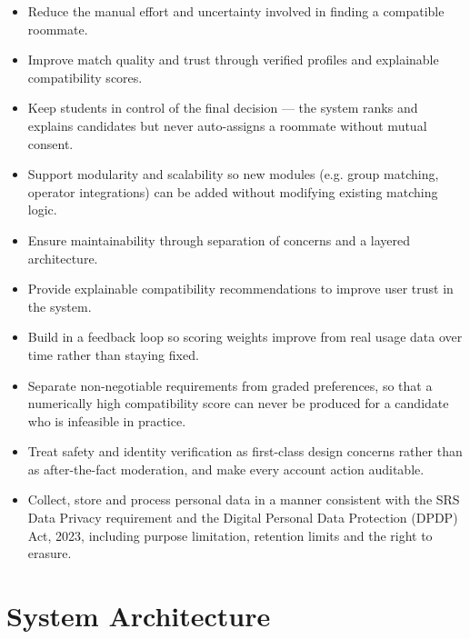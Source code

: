 \documentclass[12pt,a4paper]{report}
\begin{document}
\begin{itemize}[noitemsep]
    \item Reduce the manual effort and uncertainty involved in finding a compatible roommate.
    \vspace{1mm}
    \item Improve match quality and trust through verified profiles and explainable compatibility scores.
    \vspace{1mm}
    \item Keep students in control of the final decision --- the system ranks and explains candidates but never auto-assigns a roommate without mutual consent.
    \vspace{1mm}
    \item Support modularity and scalability so new modules (e.g. group matching, operator integrations) can be added without modifying existing matching logic.
    \vspace{1mm}
    \item Ensure maintainability through separation of concerns and a layered architecture.
    \vspace{1mm}
    \item Provide explainable compatibility recommendations to improve user trust in the system.
    \vspace{1mm}
    \item Build in a feedback loop so scoring weights improve from real usage data over time rather than staying fixed.
    \vspace{1mm}
    \item Separate non-negotiable requirements from graded preferences, so that a numerically high compatibility score can never be produced for a candidate who is infeasible in practice.
    \vspace{1mm}
    \item Treat safety and identity verification as first-class design concerns rather than as after-the-fact moderation, and make every account action auditable.
    \vspace{1mm}
    \item Collect, store and process personal data in a manner consistent with the SRS Data Privacy requirement and the Digital Personal Data Protection (DPDP) Act, 2023, including purpose limitation, retention limits and the right to erasure.
\end{itemize}

\chapter{System Architecture}
\end{document}

